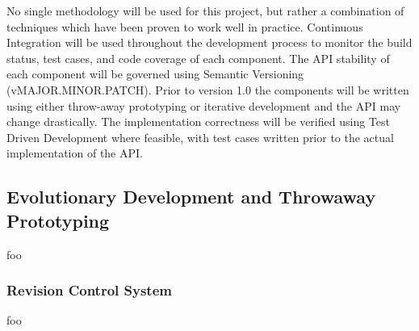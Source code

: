 \documentclass[12pt, a4paper]{article}
\begin{document}
No single methodology will be used for this project, but rather a combination of techniques which have been proven to work well in practice. Continuous Integration will be used throughout the development process to monitor the build status, test cases, and code coverage of each component. The API stability of each component will be governed using Semantic Versioning (vMAJOR.MINOR.PATCH). Prior to version 1.0 the components will be written using either throw-away prototyping or iterative development and the API may change drastically. The implementation correctness will be verified using Test Driven Development where feasible, with test cases written prior to the actual implementation of the API.





\subsection{Evolutionary Development and Throwaway Prototyping}

foo


\subsubsection{Revision Control System}

foo

\end{document}
